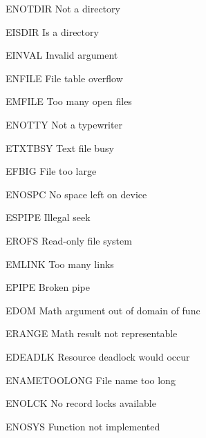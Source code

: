\begin{datadesc}{ENOTDIR} Not a directory \end{datadesc}
\begin{datadesc}{EISDIR} Is a directory \end{datadesc}
\begin{datadesc}{EINVAL} Invalid argument \end{datadesc}
\begin{datadesc}{ENFILE} File table overflow \end{datadesc}
\begin{datadesc}{EMFILE} Too many open files \end{datadesc}
\begin{datadesc}{ENOTTY} Not a typewriter \end{datadesc}
\begin{datadesc}{ETXTBSY} Text file busy \end{datadesc}
\begin{datadesc}{EFBIG} File too large \end{datadesc}
\begin{datadesc}{ENOSPC} No space left on device \end{datadesc}
\begin{datadesc}{ESPIPE} Illegal seek \end{datadesc}
\begin{datadesc}{EROFS} Read-only file system \end{datadesc}
\begin{datadesc}{EMLINK} Too many links \end{datadesc}
\begin{datadesc}{EPIPE} Broken pipe \end{datadesc}
\begin{datadesc}{EDOM} Math argument out of domain of func \end{datadesc}
\begin{datadesc}{ERANGE} Math result not representable \end{datadesc}
\begin{datadesc}{EDEADLK} Resource deadlock would occur \end{datadesc}
\begin{datadesc}{ENAMETOOLONG} File name too long \end{datadesc}
\begin{datadesc}{ENOLCK} No record locks available \end{datadesc}
\begin{datadesc}{ENOSYS} Function not implemented \end{datadesc}
